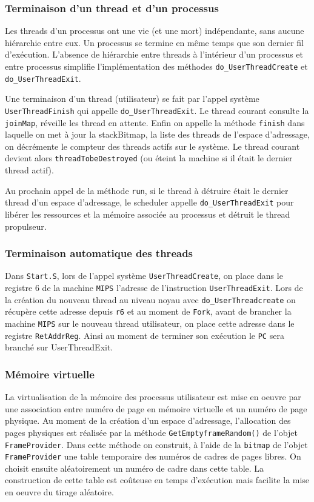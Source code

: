 \documentclass[11pt]{article}
\theoremstyle{definition}
\theoremstyle{definition}
\begin{document}
\subsubsection{Terminaison d'un thread et d'un processus}
Les threads d'un processus ont une vie (et une mort) indépendante, sans aucune hiérarchie entre eux.
Un processus se termine en même temps que son dernier fil d'exécution.
L'absence de hiérarchie entre threads à l'intérieur d'un processus et entre processus simplifie
l'implémentation des méthodes \texttt{do\_UserThreadCreate} et \texttt{do\_UserThreadExit}.

Une terminaison d'un thread (utilisateur) se fait par l'appel système \texttt{UserThreadFinish} qui appelle \texttt{do\_UserThreadExit}. Le thread courant consulte la \texttt{joinMap}, réveille les thread en attente. Enfin on appelle la méthode \texttt{finish} dans laquelle on met à jour la stackBitmap, la liste des threads de l'espace d'adressage, on décrémente le compteur des threads actifs sur le système. Le thread courant devient alors \texttt{threadTobeDestroyed} (ou éteint la machine si il était le dernier thread actif).

Au prochain appel de la méthode \texttt{run}, si le thread à détruire était le dernier thread d'un espace d'adressage, le scheduler appelle \texttt{do\_UserThreadExit} pour libérer les ressources et la mémoire associée au processus et détruit le thread propulseur.

\subsubsection{Terminaison automatique des threads}
Dans \texttt{Start.S}, lors de l'appel système \texttt{UserThreadCreate}, on place dans le registre $6$ de la machine \texttt{MIPS} l'adresse de l'instruction \texttt{UserThreadExit}.
Lors de la création du nouveau thread au niveau noyau avec \texttt{do\_UserThreadcreate} on récupère
cette adresse depuis \texttt{r6} et au moment de \texttt{Fork}, avant de brancher la machine \texttt{MIPS} sur
le nouveau thread utilisateur, on place cette adresse dans le registre \texttt{RetAddrReg}. Ainsi au moment de terminer son exécution le \texttt{PC} sera branché sur UserThreadExit.

\subsubsection{Mémoire virtuelle}
La virtualisation de la mémoire des processus utilisateur est mise en oeuvre par une association entre numéro
de page en mémoire virtuelle et un numéro de page physique. Au moment de la création d'un espace d'adressage, l'allocation des pages physiques est réalisée par la méthode \texttt{GetEmptyframeRandom()} de l'objet \texttt{FrameProvider}.
Dans cette méthode on construit, à l'aide de la \texttt{bitmap} de l'objet \texttt{FrameProvider} une table temporaire des numéros de cadres de pages libres.
On choisit ensuite aléatoirement un numéro de cadre dans cette table. La construction de cette table est coûteuse en temps d'exécution mais facilite la mise en oeuvre du tirage aléatoire.
\end{document}
